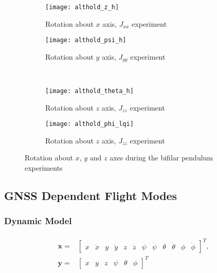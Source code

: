 \begin{figure}[H]
\begin{subfigure}{.5\linewidth}
\centering
\texttt{[image: althold\_z\_h]}
\caption{Rotation about $x$ axis, $J_{xx}$ experiment}
\label{fig:althold_z_h}
\end{subfigure}%
\begin{subfigure}{.5\linewidth}
\centering
\texttt{[image: althold\_psi\_h]}
\caption{Rotation about $y$ axis, $J_{yy}$ experiment}
\label{fig:althold_psi_h}
\end{subfigure}\\[1ex]
\begin{subfigure}{0.5\linewidth}
\centering
\texttt{[image: althold\_theta\_h]}
\caption{Rotation about $z$ axis, $J_{zz}$ experiment}
\label{fig:althold_theta_h}
\end{subfigure}
\begin{subfigure}{0.5\linewidth}
\centering
\texttt{[image: althold\_phi\_lqi]}
\caption{Rotation about $z$ axis, $J_{zz}$ experiment}
\label{fig:althold_phi_h}
\end{subfigure}
\caption{Rotation about $x$, $y$ and $z$ axes during the bifilar pendulum experiments}
\label{fig:althold_h}
\end{figure}

\subsection{GNSS Dependent Flight Modes}

\subsubsection{Dynamic Model}
\begin{align}
\begin{split}
\mathbf{x} = & \begin{bmatrix}
x & \dot{x} & y & \dot{y} & z & \dot{z} & \psi & \dot{\psi} & \theta & \dot{\theta} & \phi & \dot{\phi}
\end{bmatrix}^{T},\\[15px]
\mathbf{y} = & \begin{bmatrix}
x & y & z & \psi & \theta & \phi
\end{bmatrix}^{T}
\end{split}
\end{align}

